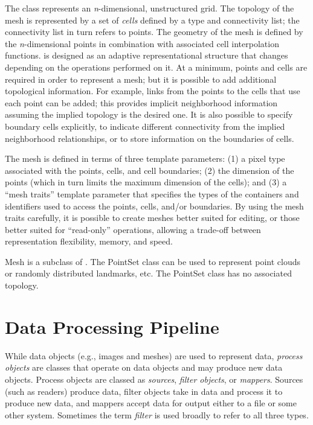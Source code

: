 The  class represents an \emph{n}-dimensional, unstructured grid. The
topology of the mesh is represented by a set of \emph{cells} defined by a type
and connectivity list; the connectivity list in turn refers to points. The
geometry of the mesh is defined by the \emph{n}-dimensional points in
combination with associated cell interpolation functions.  is
designed as an adaptive representational structure that changes depending on
the operations performed on it. At a minimum, points and cells are required in
order to represent a mesh; but it is possible to add additional topological
information.  For example, links from the points to the cells that use each
point can be added; this provides implicit neighborhood information assuming
the implied topology is the desired one. It is also possible to specify
boundary cells explicitly, to indicate different connectivity from the implied
neighborhood relationships, or to store information on the boundaries of
cells.

The mesh is defined in terms of three template parameters: (1) a pixel type
associated with the points, cells, and cell boundaries; (2) the dimension of
the points (which in turn limits the maximum dimension of the cells); and (3)
a ``mesh traits'' template parameter that specifies the types of the
containers and identifiers used to access the points, cells, and/or
boundaries. By using the mesh traits carefully, it is possible to create
meshes better suited for editing, or those better suited for ``read-only''
operations, allowing a trade-off between representation flexibility, memory,
and speed.

Mesh is a subclass of . The PointSet
class can be used to represent point clouds or randomly distributed
landmarks, etc. The PointSet class has no associated topology.


\section{Data Processing Pipeline}%
\label{sec:DataProcessingPipeline}%
%
%
%
%
%

While data objects (e.g., images and meshes) are used to represent data,
\emph{process objects} are classes that operate on data objects and may
produce new data objects. Process objects are classed as
\emph{sources}, \emph{filter objects}, or \emph{mappers}.  Sources (such as
readers) produce data, filter objects take in data and process it to produce
new data, and mappers accept data for output either to a file or
some other system.  Sometimes the term \emph{filter} is used broadly
to refer to all three types.


